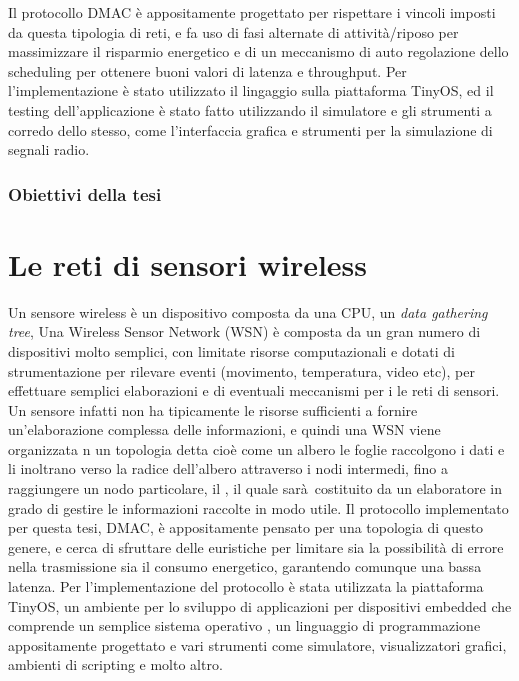 \documentclass[twoside,11pt,a4paper,italian,openany]{book}
\begin{document}
Il protocollo DMAC è appositamente progettato per rispettare i vincoli imposti da 
questa tipologia di reti, e fa uso di fasi alternate di attività/riposo per massimizzare 
il risparmio energetico e di un meccanismo di auto regolazione dello scheduling per 
ottenere buoni valori di latenza e throughput.
Per l'implementazione è stato utilizzato il lingaggio \nesc sulla piattaforma TinyOS, ed il 
testing dell'applicazione è stato fatto utilizzando il simulatore \tos  e gli strumenti a 
corredo dello stesso, come l'interfaccia grafica \tv e strumenti per la simulazione di 
segnali radio.




\subsection{Obiettivi  della tesi}
\tableofcontents

\chapter{Le reti di sensori wireless}
Un sensore wireless è un dispositivo composta da una CPU, un 
 \emph{data gathering tree},
Una Wireless Sensor Network (WSN) è composta da un gran numero di dispositivi molto semplici, 
con limitate risorse computazionali e dotati di strumentazione per rilevare eventi (movimento,
temperatura, video etc), per effettuare semplici elaborazioni e di eventuali meccanismi per 
i
 le reti di sensori.
Un sensore infatti non ha tipicamente le risorse sufficienti a fornire un'elaborazione 
complessa delle informazioni, e quindi una WSN viene organizzata n un topologia detta cioè come un albero le foglie 
raccolgono i dati e li inoltrano verso la radice dell'albero attraverso i nodi intermedi, 
fino a raggiungere un nodo particolare, il \sink, il quale sarà costituito da un elaboratore in 
grado di gestire le informazioni raccolte in modo utile.
Il protocollo implementato per questa tesi, DMAC\cite{DMAC}, è appositamente pensato per una 
topologia di questo genere, e cerca di sfruttare delle euristiche per limitare sia la 
possibilità di errore nella trasmissione sia il consumo energetico, garantendo comunque una 
bassa latenza.
Per l'implementazione del protocollo è stata utilizzata la piattaforma TinyOS, un ambiente per 
lo sviluppo di applicazioni per dispositivi embedded che comprende un semplice sistema operativo
, un linguaggio di programmazione appositamente progettato e vari strumenti come simulatore, 
visualizzatori grafici, ambienti di scripting e molto altro. 
\end{document}
